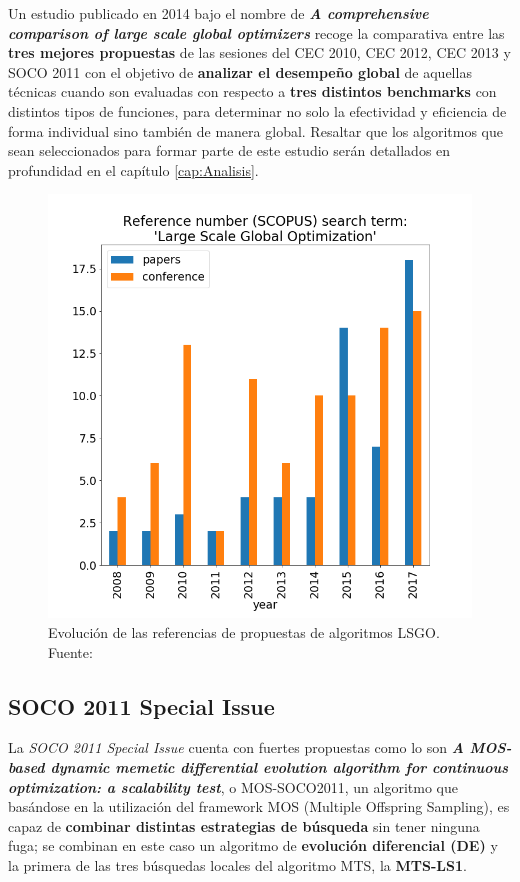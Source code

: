 Un estudio publicado en 2014 bajo el nombre de \textbf{\textit{A comprehensive comparison of large scale global optimizers}}\cite{ComprehensiveComparison} recoge la comparativa entre las \textbf{tres mejores propuestas} de las sesiones del CEC 2010, CEC 2012, CEC 2013 y SOCO 2011 con el objetivo de \textbf{analizar el desempeño global} de aquellas técnicas cuando son evaluadas con respecto a\textbf{ tres distintos benchmarks} con distintos tipos de funciones, para determinar no solo la efectividad y eficiencia de forma individual sino también de manera global. Resaltar que los algoritmos que sean seleccionados para formar parte de este estudio serán detallados en profundidad en el capítulo \ref{cap:Analisis}.

\begin{figure}[h]
	\centering
	\includegraphics[scale=0.5]{imagenes/LSGO-Evolution}
	\caption{Evolución de las referencias de propuestas de algoritmos LSGO. Fuente: \cite{WCCI-SHADEILS}}
	\label{fig:LSGO-Evolution}
\end{figure}

\subsection{SOCO 2011 Special Issue}
La \textit{SOCO 2011 Special Issue} cuenta con fuertes propuestas como lo son \textbf{\textit{A MOS-based dynamic memetic differential evolution algorithm for continuous optimization: a scalability test}}\cite{MOS2010}, o MOS-SOCO2011, un algoritmo que basándose en la utilización del framework MOS (Multiple Offspring Sampling), es capaz de \textbf{combinar distintas estrategias de búsqueda} sin tener ninguna fuga; se combinan en este caso un algoritmo de \textbf{evolución diferencial (DE)} y la primera de las tres búsquedas locales del algoritmo MTS\cite{MTS-LSGO}, la \textbf{MTS-LS1}.

